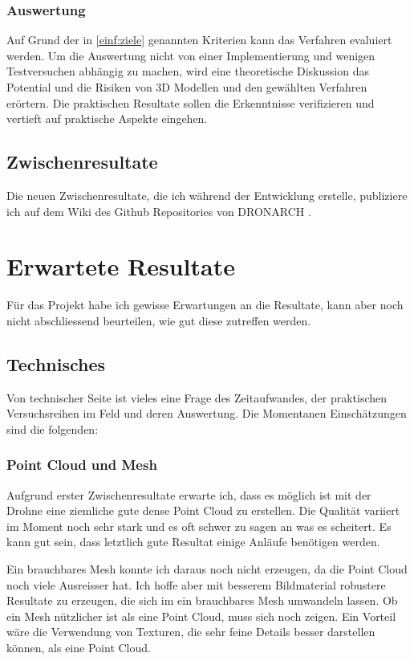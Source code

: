 \documentclass{paper}
\begin{document}
			\subsubsection{Auswertung}
				Auf Grund der in \autoref{einf:ziele} genannten Kriterien kann das Verfahren evaluiert werden. Um die Auswertung nicht von einer Implementierung und wenigen Testversuchen abhängig zu machen, wird eine theoretische Diskussion das Potential und die Risiken von 3D Modellen und den gewählten Verfahren erörtern.
				Die praktischen Resultate sollen die Erkenntnisse verifizieren und vertieft auf praktische Aspekte eingehen.
		
		\subsection{Zwischenresultate}
			Die neuen Zwischenresultate, die ich während der Entwicklung erstelle, publiziere ich auf dem Wiki des Github Repositories von DRONARCH \cite{dronarch:github}.		

	\section{Erwartete Resultate}
		Für das Projekt habe ich gewisse Erwartungen an die Resultate, kann aber noch nicht abschliessend beurteilen, wie gut diese zutreffen werden.
		\subsection{Technisches}
			Von technischer Seite ist vieles eine Frage des Zeitaufwandes, der praktischen Versuchsreihen im Feld und deren Auswertung. Die Momentanen Einschätzungen sind die folgenden:
			\subsubsection{Point Cloud und Mesh}
				Aufgrund erster Zwischenresultate erwarte ich, dass es möglich ist mit der Drohne eine ziemliche gute dense Point Cloud zu erstellen.
				Die Qualität variiert im Moment noch sehr stark und es oft schwer zu sagen an was es scheitert.
				Es kann gut sein, dass letztlich gute Resultat einige Anläufe benötigen werden.
				
				Ein brauchbares Mesh konnte ich daraus noch nicht erzeugen, da die Point Cloud noch viele Ausreisser hat. Ich hoffe aber mit besserem Bildmaterial robustere Resultate zu erzeugen, die sich im ein brauchbares Mesh umwandeln lassen. Ob ein Mesh nützlicher ist als eine Point Cloud, muss sich noch zeigen. Ein Vorteil wäre die Verwendung von Texturen, die sehr feine Details besser darstellen können, als eine Point Cloud.
				
\end{document}
